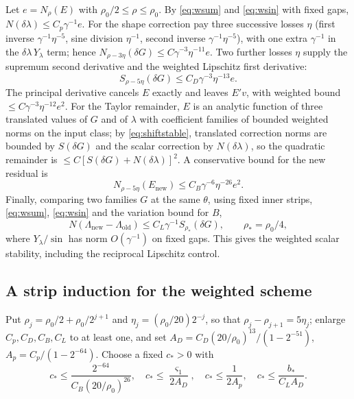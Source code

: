 \documentclass[11pt]{amsart}
\numberwithin{equation}{section}
\theoremstyle{definition}
\theoremstyle{remark}
\begin{document}
Let $e=N_\rho(E)$ with $\rho_0/2\le\rho\le\rho_0$. By \eqref{eq:wsum} and \eqref{eq:wsin} with fixed gaps, $N(\delta\lambda)\le C_p\gamma^{-1}e$. For the shape correction pay three successive losses $\eta$ (first inverse $\gamma^{-1}\eta^{-5}$, sine division $\eta^{-1}$, second inverse $\gamma^{-1}\eta^{-5}$), with one extra $\gamma^{-1}$ in the $\delta\lambda\,Y_\lambda$ term; hence $N_{\rho-3\eta}(\delta G)\le C\gamma^{-3}\eta^{-11}e$. Two further losses $\eta$ supply the supremum second derivative and the weighted Lipschitz first derivative:
\begin{equation}\label{eq:wcorr}
S_{\rho-5\eta}(\delta G)\le C_D\gamma^{-3}\eta^{-13}e.
\end{equation}
The principal derivative cancels $E$ exactly and leaves $E'v$, with weighted bound $\le C\gamma^{-3}\eta^{-12}e^2$. For the Taylor remainder, $E$ is an analytic function of three translated values of $G$ and of $\lambda$ with coefficient families of bounded weighted norms on the input class; by \eqref{eq:shiftstable}, translated correction norms are bounded by $S(\delta G)$ and the scalar correction by $N(\delta\lambda)$, so the quadratic remainder is $\le C[S(\delta G)+N(\delta\lambda)]^2$. A conservative bound for the new residual is
\begin{equation}\label{eq:wres}
N_{\rho-5\eta}(E_{\mathrm{new}})\le C_B\gamma^{-6}\eta^{-26}e^2.
\end{equation}
Finally, comparing two families $G$ at the same $\theta$, using fixed inner strips, \eqref{eq:wsum}, \eqref{eq:wsin} and the variation bound for $B$,
\begin{equation}\label{eq:wLam}
N(\Lambda_{\mathrm{new}}-\Lambda_{\mathrm{old}})\le C_L\gamma^{-1}S_{\rho_*}(\delta G),\qquad\rho_*=\rho_0/4 ,
\end{equation}
where $Y_\lambda/\sin$ has norm $O(\gamma^{-1})$ on fixed gaps. This gives the weighted scalar stability, including the reciprocal Lipschitz control.

\subsection{A strip induction for the weighted scheme}
Put $\rho_j=\rho_0/2+\rho_0/2^{j+1}$ and $\eta_j=(\rho_0/20)2^{-j}$, so that $\rho_j-\rho_{j+1}=5\eta_j$; enlarge $C_p,C_D,C_B,C_L$ to at least one, and set $A_D=C_D(20/\rho_0)^{13}/(1-2^{-51})$, $A_p=C_p/(1-2^{-64})$. Choose a fixed $c_*>0$ with
\begin{equation}\label{eq:c2}
c_*\le\frac{2^{-64}}{C_B(20/\rho_0)^{26}},\quad c_*\le\frac{\varsigma_1}{2A_D},\quad c_*\le\frac1{2A_p},\quad c_*\le\frac {b_*}{C_LA_D}.
\end{equation}
\end{document}
